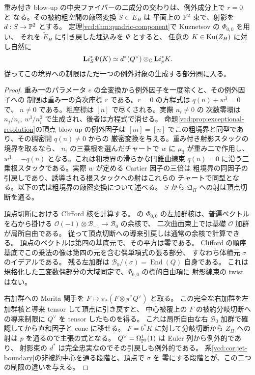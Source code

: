 \begin{proposition}[厳密変換された共通境界上の比較核]\label{vcd:prop:boundary-fiber}
重み付き blow-up の中央ファイバーの二成分の交わりは、例外成分上で $r=0$ と
なる。その被約粗空間の厳密変換 $S\subset\widetilde E_H$ は
平面上の $\mathbb P^2$ 束で、射影を $d:S\to\mathbb P^2$ とする。
定理\ref{vcd:thm:quadric-component}で Kuznetsov の $\Phi_{0,0}$ を用い、
それを $\widetilde E_H$ に引き戻した埋込みを $\Psi$ とすると、
任意の $K\in\operatorname{Ku}(Z_H)$ に対し自然に
\[
       {\bf L}i_S^*\Psi(K)\simeq
       d^*(Q^\vee)\otimes_{\mathbb C}{\bf L}i_p^*K .
\]
従ってこの境界への制限はただ一つの例外対象の生成する部分圏に入る。
\end{proposition}
\begin{proof}
重み一のパラメータ $e$ の全変換から例外因子を一度除くと、その例外因子への
制限は重み一の斉次座標 $r$ である。$r=0$ の方程式は $q(n)+w^3=0$ で、
$n\ne0$ である。粗座標は $[n]$ で尽くされる。実際 $n_i\ne0$ の
次数零環は $n_j/n_i,\ w^3/n_i^2$ で生成され、後者は方程式で消せる。
命題\ref{vcd:prop:exceptional-resolution}の頂点 blow-up の例外因子は
$[m]=[n]$ でこの粗境界と同型であり、その稠密開 $q(n)\ne0$ からの
厳密変換を与える。重み付き射影スタックの境界を取るなら、
$n_i$ の三乗根を選んだチャートで $w$ に $\mu_3$ が重み二で作用し、
$w^3=-q(n)$ となる。これは粗境界の滑らかな円錐曲線束 $q(n)=0$
に沿う三乗根スタックである。実際 $w$ が定める Cartier 因子の三倍は
粗境界の同因子の引戻しであり、誘導される根スタックへの射はこれらの
チャートで同型となる。以下の式は粗境界の厳密変換について述べる。
$S$ から $\mathfrak Q_H$ への射は頂点切断を通る。

頂点切断における Clifford 核を計算する。
\cite[Lemmas~4.5, 4.7, Remark~4.8]{NFMKuznetsovQuadric} の
$\Phi_{0,0}$ の左加群核は、普遍ベクトルを右から掛ける
$\mathcal O(-1)\otimes\mathcal B_{-1}\to\mathcal B_0$ の余核で、
二次曲面束上では基礎 $\mathcal O$ 加群が局所自由である。
従って頂点切断への導来引戻しは通常の余核で計算できる。
頂点のベクトルは第四の基底元で、その平方は零である。
Clifford の順序基底でこの乗法の像は第四の元を含む偶単項式の張る部分、
すなわち体積元 $\sigma$ のイデアルである。
残る左加群は $\mathcal B_0/(\sigma)=\operatorname{End}(Q)$ 自身である。
これは規格化した三変数偶部分の大域同定で、$\Phi_{0,0}$ の標的自由項に
射影線束の twist はない。

右加群への Morita 関手を $F\mapsto\pi_*(F\otimes\pi^*Q^\vee)$ と取る。
この完全な右加群を左加群核と導来 tensor して頂点に引き戻すと、
中心被覆上の $F$ の被約分岐切断への導来制限に $Q^\vee$ を tensor したものを得る。
これは局所自由な右 $\mathcal B_0$ 加群で確認してから直和因子と cone に移せる。
$F=b^*K$ に対して分岐切断から $Z_H$ への射は $p$ を通るので主張の式となる。
$Q^\vee=\Omega_{\mathbb P^2}^1(1)$ は Euler 列から例外的であり、
射影束の $d^*$ は完全忠実なのでその引戻しも例外的である。
系\ref{vcd:cor:jet-boundary}の非被約中心を通る段階と、頂点で $\sigma$ を
零にする段階とが、この二つの制限の違いを与える。
\end{proof}

